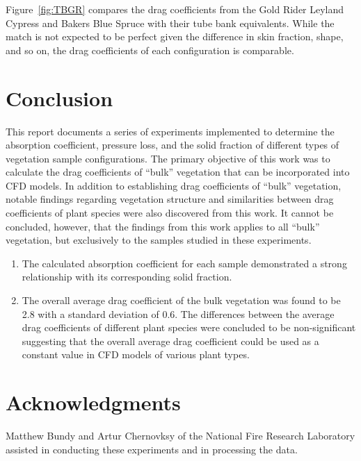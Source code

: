 \documentclass[12pt]{article}
\begin{document}
Figure~\ref{fig:TBGR} compares the drag coefficients from the Gold Rider Leyland Cypress and Bakers Blue Spruce with their tube bank equivalents. While the match is not expected to be perfect given the difference in skin fraction, shape, and so on, the drag coefficients of each configuration is comparable.
\pagebreak

\section*{Conclusion}
This report documents a series of experiments implemented to determine the absorption coefficient, pressure loss, and the solid fraction of different types of vegetation sample configurations. The primary objective of this work was to calculate the drag coefficients of ``bulk'' vegetation that can be incorporated into CFD models. In addition to establishing drag coefficients of ``bulk''  vegetation, notable findings regarding vegetation structure and similarities between drag coefficients of plant species were also discovered from this work. It cannot be concluded, however, that the findings from this work applies to all ``bulk'' vegetation, but exclusively to the samples studied in these experiments.

\begin{enumerate}
  \item The calculated absorption coefficient for each sample demonstrated a strong relationship with its corresponding solid fraction.
  \item The overall average drag coefficient of the bulk vegetation was found to be 2.8 with a standard deviation of 0.6. The differences between the average drag coefficients of different plant species were concluded to be non-significant suggesting that the overall average drag coefficient could be used as a constant value in CFD models of various plant types.
\end{enumerate}

\section*{Acknowledgments}

\noindent Matthew Bundy and Artur Chernovksy of the National Fire Research Laboratory assisted in conducting these experiments and in processing the data.   \\
\pagebreak
\end{document}
